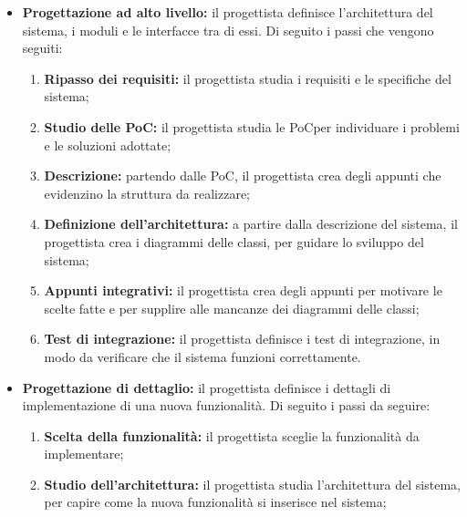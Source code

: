 \begin{itemize}
	\item \textbf{Progettazione ad alto livello:} il progettista definisce
	      l'architettura del sistema, i moduli e le interfacce tra di essi. Di
	      seguito i passi che vengono seguiti:
	      \begin{enumerate}
		      \item \textbf{Ripasso dei requisiti:} il progettista studia i
		            requisiti e le specifiche del sistema;

		      \item \textbf{Studio delle PoC\g:} il progettista studia le PoC\g per
		            individuare i problemi e le soluzioni adottate;

		      \item \textbf{Descrizione:} partendo dalle PoC\g, il progettista
		            crea degli appunti che evidenzino la struttura da
		            realizzare;

		      \item \textbf{Definizione dell'architettura:} a partire dalla
		            descrizione del sistema, il progettista crea i diagrammi
		            delle classi, per guidare lo sviluppo del sistema;

		      \item \textbf{Appunti integrativi:} il progettista
		            crea degli appunti per motivare le scelte fatte e per
		            supplire alle mancanze dei diagrammi delle classi;

		      \item \textbf{Test di integrazione:} il progettista definisce i
		            test di integrazione, in modo da verificare che il sistema
		            funzioni correttamente.
	      \end{enumerate}

	\item \textbf{Progettazione di dettaglio:} il progettista definisce i
	      dettagli di implementazione di una nuova funzionalità. Di seguito i
	      passi da seguire:
	      \begin{enumerate}
		      \item \textbf{Scelta della funzionalità:} il progettista
		            sceglie la funzionalità da implementare;

		      \item \textbf{Studio dell'architettura:} il progettista
		            studia l'architettura del sistema, per capire come
		            la nuova funzionalità si inserisce nel sistema;


\end{enumerate}
\end{itemize}
